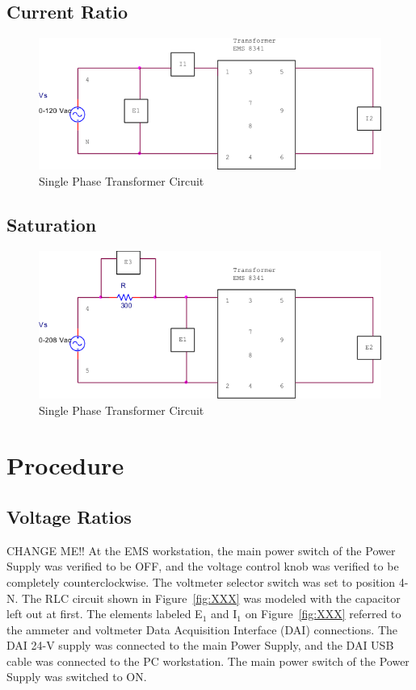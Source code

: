 \documentclass{article}
\begin{document}
\subsection{Current Ratio}
\begin{figure}[H]
  \centering
  \includegraphics[width=.8\textwidth]{circuit_02}
  \caption{Single Phase Transformer Circuit}
  \label{fig:circuit_02}
\end{figure}

\subsection{Saturation}
\begin{figure}[H]
  \centering
  \includegraphics[width=.8\textwidth]{circuit_03}
  \caption{Single Phase Transformer Circuit}
  \label{fig:circuit_03}
\end{figure}

\section{Procedure}
\subsection{Voltage Ratios}
\label{part1}
CHANGE ME!! At the EMS workstation, the main power switch of the Power Supply
was verified to be OFF, and the voltage control knob was verified to be
completely counterclockwise. The voltmeter selector switch was set to position
4-N. The RLC circuit shown in Figure~\ref{fig:XXX} was modeled with the
capacitor left out at first. The elements labeled E$_1$ and I$_1$ on
Figure~\ref{fig:XXX} referred to the ammeter and voltmeter Data Acquisition
Interface (DAI) connections. The DAI 24-V supply was connected to the main
Power Supply, and the DAI USB cable was connected to the PC workstation. The
main power switch of the Power Supply was switched to ON.
\end{document}

